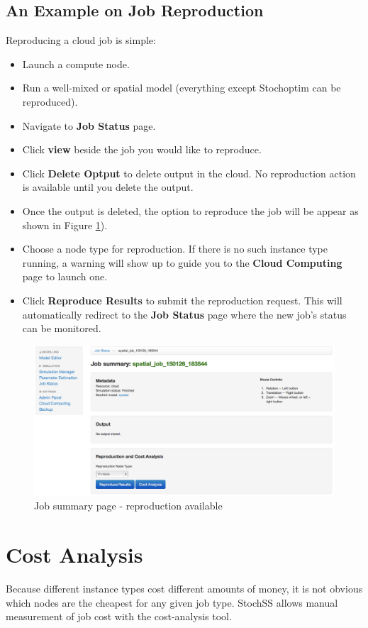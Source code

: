 \subsection{An Example on Job Reproduction}
Reproducing a cloud job is simple:

\begin{itemize}
\item Launch a compute node.
\item Run a well-mixed or spatial model (everything except Stochoptim can be reproduced).
\item Navigate to \textbf{Job Status} page.
\item Click \textbf{view} beside the job you would like to reproduce.
\item Click \textbf{Delete Optput} to delete output in the cloud. No reproduction action is available until you delete the output.
\item Once the output is deleted, the option to reproduce the job will be appear as shown in Figure \ref{fig:3}).
\item Choose a node type for reproduction. If there is no such instance type running, a warning will show up to guide you to the \textbf{Cloud Computing} page to launch one.
\item Click \textbf{Reproduce Results} to submit the reproduction request. This will automatically redirect to the \textbf{Job Status} page where the new job's status can be monitored.
\end{itemize}

\begin{figure}[!ht]
\centering
\includegraphics[scale=0.35]{T6/T6_fig_reproduction1.png}
\caption{Job summary page - reproduction available}
\label{fig:3}
\end{figure}

\section{Cost Analysis}
Because different instance types cost different amounts of money, it is not obvious which nodes are the cheapest for any given job type. StochSS allows manual measurement of job cost with the cost-analysis tool.

